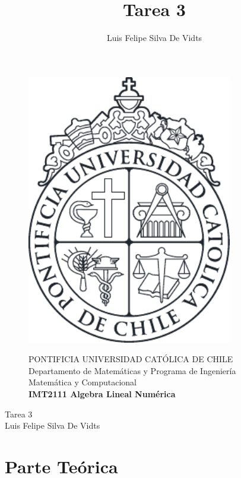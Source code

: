 \documentclass{article}
\title{Tarea 3\\}
\author{Luis Felipe Silva De Vidts}
\begin{document}
\begin{figure}
\begin{minipage}{2.5cm}
\includegraphics[width=0.8\textwidth]{./figures/LogoUC-BN}
\end{minipage}
\begin{minipage}{14.5cm}
\vspace{4mm}
{\sc PONTIFICIA UNIVERSIDAD CAT\'OLICA DE CHILE}\\
Departamento de Matemáticas y Programa de Ingeniería Matemática y Computacional \\
{\bf IMT2111 Algebra Lineal Numérica}\\
\vspace{0mm}
\hrulefill
\end{minipage}
\end{figure}
\phantom{""}
\vspace{-5mm}
\normalsize
\begin{center}
\Huge Tarea 3\\
\normalsize Luis Felipe Silva De Vidts
\end{center}
\section*{Parte Teórica}
\end{document}
